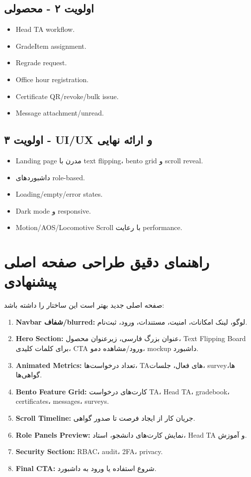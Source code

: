 \documentclass[12pt,a4paper]{article}
\begin{document}
\subsection{اولویت ۲ - محصولی}
\begin{itemize}
  \item Head TA workflow.
  \item GradeItem assignment.
  \item Regrade request.
  \item Office hour registration.
  \item Certificate QR/revoke/bulk issue.
  \item Message attachment/unread.
\end{itemize}

\subsection{اولویت ۳ - UI/UX و ارائه نهایی}
\begin{itemize}
  \item Landing page مدرن با text flipping، bento grid و scroll reveal.
  \item داشبوردهای role-based.
  \item Loading/empty/error states.
  \item Dark mode و responsive.
  \item Motion/AOS/Locomotive Scroll با رعایت performance.
\end{itemize}

\section{راهنمای دقیق طراحی صفحه اصلی پیشنهادی}
صفحه اصلی جدید بهتر است این ساختار را داشته باشد:

\begin{enumerate}
  \item \textbf{Navbar شفاف/blurred:} لوگو، لینک امکانات، امنیت، مستندات، ورود، ثبت‌نام.
  \item \textbf{Hero Section:} عنوان بزرگ فارسی، زیرعنوان محصول، Text Flipping Board برای کلمات کلیدی، CTA ورود/مشاهده دمو، mockup داشبورد.
  \item \textbf{Animated Metrics:} تعداد درخواست‌ها، TAهای فعال، جلسات، surveyها، گواهی‌ها.
  \item \textbf{Bento Feature Grid:} کارت‌های درخواست TA، Head TA، gradebook، certificates، messages، surveys.
  \item \textbf{Scroll Timeline:} جریان کار از ایجاد فرصت تا صدور گواهی.
  \item \textbf{Role Panels Preview:} نمایش کارت‌های دانشجو، استاد، Head TA و آموزش.
  \item \textbf{Security Section:} RBAC، audit، 2FA، privacy.
  \item \textbf{Final CTA:} شروع استفاده یا ورود به داشبورد.
\end{enumerate}
\end{document}
